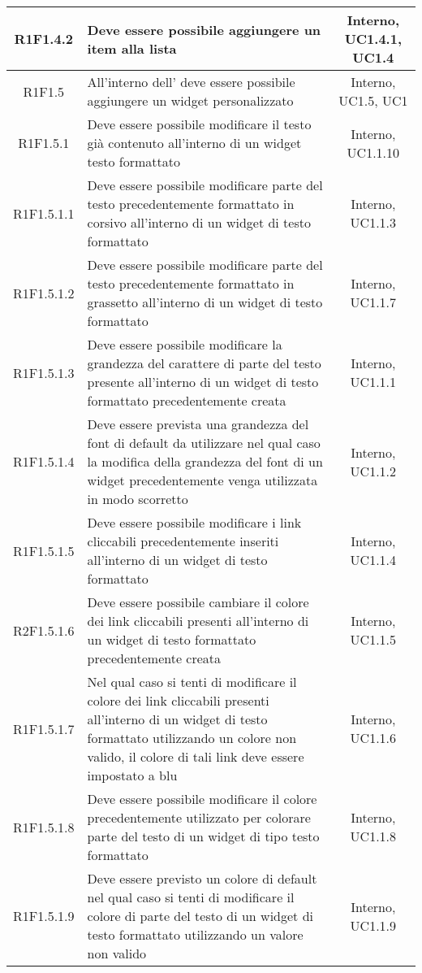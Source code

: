 \begin{longtable}{|c|>{\centering}m{7cm}|c|}
		\hline
		R1F1.4.2 & Deve essere possibile aggiungere un item alla lista & Interno, UC1.4.1, UC1.4 \\
		\hline
		R1F1.5 & All'interno dell'\termine{SDK} deve essere possibile aggiungere un widget personalizzato & Interno, UC1.5, UC1 \\ 
			\hline
		R1F1.5.1 & Deve essere possibile modificare il testo già contenuto all'interno di un widget testo formattato & Interno, UC1.1.10 \\
		\hline
		R1F1.5.1.1 & Deve essere possibile modificare parte del testo precedentemente formattato in corsivo all'interno di un widget di testo formattato & Interno, UC1.1.3 \\
		\hline
		R1F1.5.1.2 & Deve essere possibile modificare parte del testo precedentemente formattato in grassetto all'interno di un widget di testo formattato & Interno, UC1.1.7 \\
		\hline
		R1F1.5.1.3 & Deve essere possibile modificare la grandezza del carattere di parte del testo presente all'interno di un widget di testo formattato precedentemente creata & Interno, UC1.1.1\\
		\hline
		R1F1.5.1.4 & Deve essere prevista una grandezza del font di default da utilizzare nel qual caso la modifica della grandezza del font di un widget precedentemente venga utilizzata in modo scorretto & Interno, UC1.1.2 \\
		\hline
		R1F1.5.1.5 & Deve essere possibile modificare i link cliccabili precedentemente inseriti all'interno di un widget di testo formattato & Interno, UC1.1.4 \\
		\hline
		R2F1.5.1.6 & Deve essere possibile cambiare il colore dei link cliccabili presenti all'interno di un widget di testo formattato precedentemente creata & Interno, UC1.1.5 \\
		\hline
		R1F1.5.1.7 & Nel qual caso si tenti di modificare il colore dei link cliccabili presenti all'interno di un widget di testo formattato utilizzando un colore non valido, il colore di tali link deve essere impostato a blu & Interno, UC1.1.6 \\
		\hline
		R1F1.5.1.8 & Deve essere possibile modificare il colore precedentemente utilizzato per colorare parte del testo di un widget di tipo testo formattato & Interno, UC1.1.8 \\
		\hline
		R1F1.5.1.9 & Deve essere previsto un colore di default nel qual caso si tenti di modificare il colore di parte del testo di un widget di testo formattato utilizzando un valore non valido & Interno, UC1.1.9 \\

\end{longtable}
